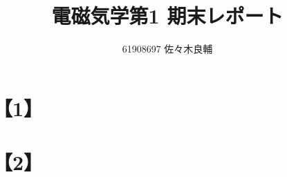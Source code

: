 \documentclass[uplatex,a4j,11pt]{jsarticle}
\begin{document}
\title{電磁気学第1 期末レポート}
\author{61908697 佐々木良輔}
\date{}
\maketitle
\section*{【1】}







\newpage
\section*{【2】}

\end{document}
